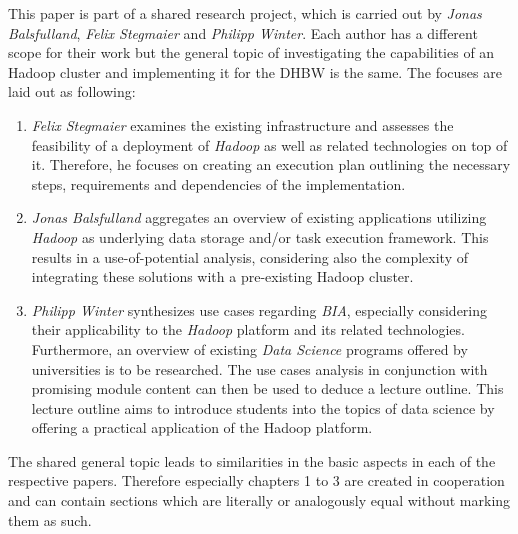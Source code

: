 This paper is part of a shared research project,
which is carried out by \emph{Jonas Balsfulland}, \emph{Felix Stegmaier} and \emph{Philipp Winter}.
Each author has a different scope for their work 
but the general topic of investigating the capabilities of an Hadoop cluster 
and implementing it for the \ac{DHBW} is the same.
The focuses are laid out as following:

\begin{enumerate}
	\item \emph{Felix Stegmaier} examines the existing infrastructure and assesses the feasibility of a deployment of \emph{Hadoop} as well as related technologies on top of it. Therefore, he focuses on creating an execution plan outlining the necessary steps, requirements and dependencies of the implementation.
	\item \emph{Jonas Balsfulland} aggregates an overview of existing applications utilizing \emph{Hadoop} as underlying data storage and/or task execution framework. This results in a use-of-potential analysis, considering also the complexity of integrating these solutions with a pre-existing Hadoop cluster.
	\item \emph{Philipp Winter} synthesizes use cases regarding \emph{\ac{BIA}}, especially considering their applicability to the \emph{Hadoop} platform and its related technologies. Furthermore, an overview of existing \emph{Data Science} programs offered by universities is to be researched. The use cases analysis in conjunction with promising module content can then be used to deduce a lecture outline. This lecture outline aims to introduce students into the topics of data science by offering a practical application of the Hadoop platform.
\end{enumerate}

The shared general topic leads to similarities in the basic aspects in each of the respective papers.
Therefore especially chapters 1 to 3 are created in cooperation 
and can contain sections which are literally or analogously equal without marking them as such.
